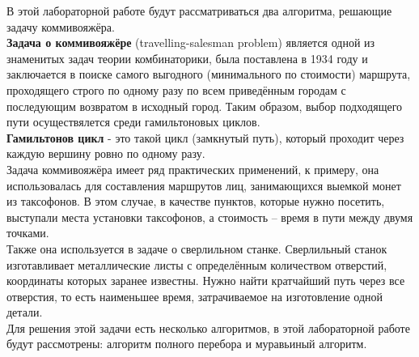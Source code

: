 В этой лабораторной работе будут рассматриваться два алгоритма, решающие задачу коммивояжёра. \\

\textbf{Задача о коммивояжёре} (travelling-salesman problem) является одной из знаменитых задач теории комбинаторики, была поставлена в 1934 году и заключается в поиске самого выгодного (минимального по стоимости) маршрута, проходящего строго по одному разу по всем приведённым городам с последующим возвратом в исходный город. Таким образом, выбор подходящего пути осуществялется среди гамильтоновых циклов.\\

\textbf{Гамильтонов цикл}  - это такой цикл (замкнутый путь), который проходит через каждую вершину ровно по одному разу.\\

Задача коммивояжёра имеет ряд практических применений, к примеру, она использовалась для составления маршрутов лиц, занимающихся выемкой монет из таксофонов. В этом случае, в качестве пунктов, которые нужно посетить, выступали места установки таксофонов, а стоимость -- время в пути между двумя точками. \\

Также она используется в задаче о сверлильном станке. Сверлильный станок изготавливает металлические листы с определённым количеством отверстий, координаты которых заранее известны. Нужно найти кратчайший путь через все отверстия, то есть наименьшее время, затрачиваемое на изготовление одной детали. \\

Для решения этой задачи есть несколько алгоритмов, в этой лабораторной работе будут рассмотрены: алгоритм полного перебора и муравьиный алгоритм.
